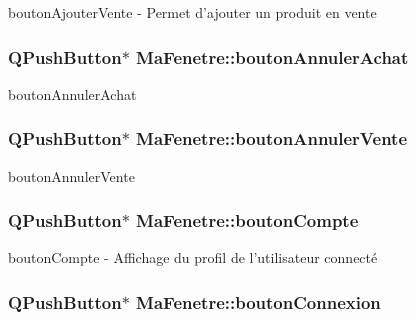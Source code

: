 bouton\-Ajouter\-Vente -\/ Permet d'ajouter un produit en vente 

\hypertarget{class_ma_fenetre_ab9146d75613df065eeed16431a95b469}{
\subsubsection[{bouton\-Annuler\-Achat}]{\setlength{\rightskip}{0pt plus 5cm}Q\-Push\-Button$\ast$ Ma\-Fenetre\-::bouton\-Annuler\-Achat\hspace{0.3cm}{\ttfamily [protected]}}}\label{class_ma_fenetre_ab9146d75613df065eeed16431a95b469}


bouton\-Annuler\-Achat 

\hypertarget{class_ma_fenetre_a5724730df59031b3e2275b9c82820446}{
\subsubsection[{bouton\-Annuler\-Vente}]{\setlength{\rightskip}{0pt plus 5cm}Q\-Push\-Button$\ast$ Ma\-Fenetre\-::bouton\-Annuler\-Vente\hspace{0.3cm}{\ttfamily [protected]}}}\label{class_ma_fenetre_a5724730df59031b3e2275b9c82820446}


bouton\-Annuler\-Vente 

\hypertarget{class_ma_fenetre_abfdb548dc88cf56eae01fd20be7b052a}{
\subsubsection[{bouton\-Compte}]{\setlength{\rightskip}{0pt plus 5cm}Q\-Push\-Button$\ast$ Ma\-Fenetre\-::bouton\-Compte\hspace{0.3cm}{\ttfamily [protected]}}}\label{class_ma_fenetre_abfdb548dc88cf56eae01fd20be7b052a}


bouton\-Compte -\/ Affichage du profil de l'utilisateur connecté 

\hypertarget{class_ma_fenetre_a6654bb6885a843d1a6ad9399eb7d0c36}{
\subsubsection[{bouton\-Connexion}]{\setlength{\rightskip}{0pt plus 5cm}Q\-Push\-Button$\ast$ Ma\-Fenetre\-::bouton\-Connexion\hspace{0.3cm}{\ttfamily [protected]}}}\label{class_ma_fenetre_a6654bb6885a843d1a6ad9399eb7d0c36}


